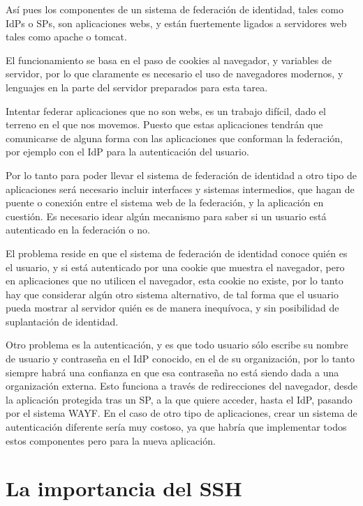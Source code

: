     Así pues los componentes de un sistema de federación de identidad,
    tales como IdPs o SPs, son aplicaciones webs, y están fuertemente
    ligados a servidores web tales como apache o tomcat.

    El funcionamiento se basa en el paso de cookies al navegador, y
    variables de servidor, por lo que claramente es necesario el uso de
    navegadores modernos, y lenguajes en la parte del servidor preparados
    para esta tarea.

    Intentar federar aplicaciones que no son webs, es un trabajo difícil,
    dado el terreno en el que nos movemos. Puesto que estas aplicaciones
    tendrán que comunicarse de alguna forma con las aplicaciones que
    conforman la federación, por ejemplo con el IdP para la autenticación
    del usuario.

    Por lo tanto para poder llevar el sistema de federación de identidad a
    otro tipo de aplicaciones será necesario incluir interfaces y sistemas
    intermedios, que hagan de puente o conexión entre el sistema web de la
    federación, y la aplicación en cuestión. Es necesario idear algún
    mecanismo para saber si un usuario está autenticado en la federación o
    no.

    El problema reside en que el sistema de federación de identidad conoce
    quién es el usuario, y si está autenticado por una cookie que muestra
    el navegador, pero en aplicaciones que no utilicen el navegador, esta
    cookie no existe, por lo tanto hay que considerar algún otro sistema
    alternativo, de tal forma que el usuario pueda mostrar al servidor
    quién es de manera inequívoca, y sin posibilidad de suplantación de
    identidad.

    Otro problema es la autenticación, y es que todo usuario sólo escribe
    su nombre de usuario y contraseña en el IdP conocido, en el de su
    organización, por lo tanto siempre habrá una confianza en que esa
    contraseña no está siendo dada a una organización externa. Esto
    funciona a través de redirecciones del navegador, desde la aplicación
    protegida tras un SP, a la que quiere acceder, hasta el IdP, pasando
    por el sistema WAYF. En el caso de otro tipo de aplicaciones, crear un
    sistema de autenticación diferente sería muy costoso, ya que habría que
    implementar todos estos componentes pero para la nueva aplicación.

    \section{La importancia del SSH}

